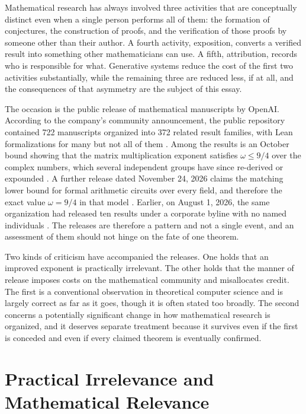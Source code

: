 \documentclass[12pt]{article}
\begin{document}
Mathematical research has always involved three activities that are conceptually distinct even when a single person performs all of them: the formation of conjectures, the construction of proofs, and the verification of those proofs by someone other than their author. A fourth activity, exposition, converts a verified result into something other mathematicians can use. A fifth, attribution, records who is responsible for what. Generative systems reduce the cost of the first two activities substantially, while the remaining three are reduced less, if at all, and the consequences of that asymmetry are the subject of this essay.

The occasion is the public release of mathematical manuscripts by OpenAI. According to the company's community announcement, the public repository contained 722 manuscripts organized into 372 related result families, with Lean formalizations for many but not all of them \cite{openai-first-look}. Among the results is an October bound showing that the matrix multiplication exponent satisfies $\omega \le 9/4$ over the complex numbers, which several independent groups have since re-derived or expounded \cite{pass-polynomial-packings, amanov-exposition}. A further release dated November 24, 2026 claims the matching lower bound for formal arithmetic circuits over every field, and therefore the exact value $\omega = 9/4$ in that model \cite{openai-nine-fourths}. Earlier, on August 1, 2026, the same organization had released ten results under a corporate byline with no named individuals \cite{openai-ten-advances}. The releases are therefore a pattern and not a single event, and an assessment of them should not hinge on the fate of one theorem.

Two kinds of criticism have accompanied the releases. One holds that an improved exponent is practically irrelevant. The other holds that the manner of release imposes costs on the mathematical community and misallocates credit. The first is a conventional observation in theoretical computer science and is largely correct as far as it goes, though it is often stated too broadly. The second concerns a potentially significant change in how mathematical research is organized, and it deserves separate treatment because it survives even if the first is conceded and even if every claimed theorem is eventually confirmed.

\section{Practical Irrelevance and Mathematical Relevance}
\end{document}
